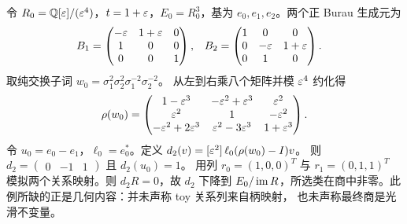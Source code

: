 令 $R_0=\mathbb{Q}[\varepsilon]/(\varepsilon^4)$，$t=1+\varepsilon$，$E_0=R_0^3$，基为 $e_0,e_1,e_2$。两个正 Burau
生成元为
\begin{align}
B_1&=
\begin{pmatrix}
-\varepsilon&1+\varepsilon&0\\
1&0&0\\
0&0&1
\end{pmatrix},
&
B_2&=
\begin{pmatrix}
1&0&0\\
0&-\varepsilon&1+\varepsilon\\
0&1&0
\end{pmatrix}.
\end{align}
取纯交换子词
$w_0=\sigma_1^2\sigma_2^2\sigma_1^{-2}\sigma_2^{-2}$。
从左到右乘八个矩阵并模 $\varepsilon^4$ 约化得
\[
\rho(w_0)=
\begin{pmatrix}
1-\varepsilon^3&-\varepsilon^2+\varepsilon^3&\varepsilon^2\\
\varepsilon^2&1&-\varepsilon^2\\
-\varepsilon^2+2\varepsilon^3&\varepsilon^2-3\varepsilon^3&1+\varepsilon^3
\end{pmatrix}.
\]
令 $u_0=e_0-e_1$，$\ell_0=e_0^*$。定义
$d_2(v)=[\varepsilon^2]\,\ell_0(\rho(w_0)-I)v$。
则 $d_2=\begin{pmatrix}0&-1&1\end{pmatrix}$ 且 $d_2(u_0)=1$。
用列 $r_0=(1,0,0)^T$ 与 $r_1=(0,1,1)^T$ 模拟两个关系映射。则 $d_2R=0$，故 $d_2$ 下降到
$E_0/\operatorname{im} R$，所选类在商中非零。此例所缺的正是几何内容：并未声称 toy 关系列来自柄映射，
也未声称最终商是光滑不变量。
